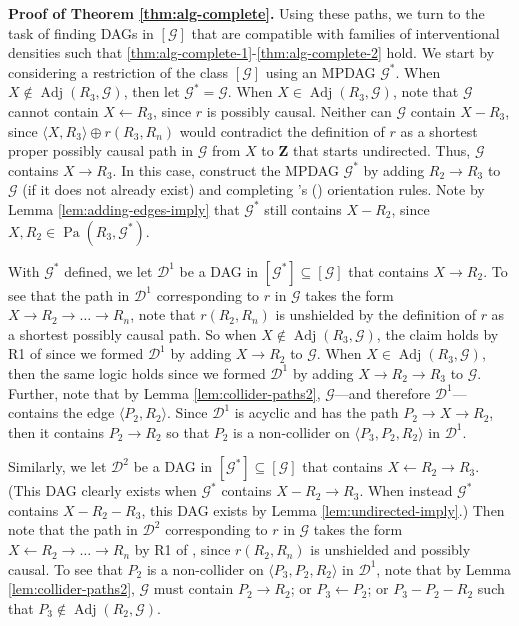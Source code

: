 \documentclass[11pt]{article}
\DeclareMathOperator{\Pa}{Pa}
\DeclareMathOperator{\Adj}{Adj}
\newcommand{\mb}[1]{\mathbf{#1}}
\newcommand{\g}[1][G]{\mathcal{#1}}
\newenvironment{proofofnoqed}[1][]{\noindent \textbf{Proof of #1.}}{}
\begin{document}
\begin{proofofnoqed}[Theorem \ref{thm:alg-complete}]
    Using these paths, we turn to the task of finding DAGs in $[\g]$ that are compatible with families of interventional densities such that \eqref{thm:alg-complete-1}-\eqref{thm:alg-complete-2} hold. We start by considering a restriction of the class $[\g]$ using an MPDAG $\g^*$. When $X \notin \Adj(R_3, \g)$, then let $\g^* = \g$. When $X \in \Adj(R_3, \g)$, note that $\g$ cannot contain $X \gets R_3$, since $r$ is possibly causal. Neither can $\g$ contain $X - R_3$, since $\langle X, R_3 \rangle \oplus r(R_3,R_n)$ would contradict the definition of $r$ as a shortest proper possibly causal path in $\g$ from $X$ to $\mb{Z}$ that starts undirected. Thus, $\g$ contains $X \to R_3$. In this case, construct the MPDAG $\g^*$ by adding $R_2 \to R_3$ to $\g$ (if it does not already exist) and completing \citeauthor{meek1995causal}'s (\citeyear{meek1995causal}) orientation rules. Note by Lemma \ref{lem:adding-edges-imply} that $\g^*$ still contains $X - R_2$, since $X,R_2 \in \Pa(R_3,\g^*)$.

    With $\g^*$ defined, we let $\g[D]^1$ be a DAG in $[\g^*] \subseteq [\g]$ that contains $X \to R_2$. To see that the path in $\g[D]^1$ corresponding to $r$ in $\g$ takes the form $X \to R_2 \to \dots \to R_n$, note that $r(R_2,R_n)$ is unshielded by the definition of $r$ as a shortest possibly causal path. So when $X \notin \Adj(R_3, \g)$, the claim holds by R1 of \cite{meek1995causal} since we formed $\g[D]^1$ by adding $X \to R_2$ to $\g$. When $X \in \Adj(R_3, \g)$, then the same logic holds since we formed $\g[D]^1$ by adding $X \to R_2 \to R_3$ to $\g$. Further, note that by Lemma \ref{lem:collider-paths2}, $\g$---and therefore $\g[D]^1$---contains the edge $\langle P_2, R_2 \rangle$. Since $\g[D]^1$ is acyclic and has the path $P_2 \to X \to R_2$, then it contains $P_2 \to R_2$ so that $P_2$ is a non-collider on $\langle P_3, P_2, R_2 \rangle$ in $\g[D]^1$.

    Similarly, we let $\g[D]^2$ be a DAG in $[\g^*] \subseteq [\g]$ that contains $X \gets R_2 \to R_3$. (This DAG clearly exists when $\g^*$ contains $X - R_2 \to R_3$. When instead $\g^*$ contains $X - R_2 - R_3$, this DAG exists by Lemma \ref{lem:undirected-imply}.) Then note that the path in $\g[D]^2$ corresponding to $r$ in $\g$ takes the form $X \gets R_2 \to \dots \to R_n$ by R1 of \cite{meek1995causal}, since $r(R_2,R_n)$ is unshielded and possibly causal. To see that $P_2$ is a non-collider on $\langle P_3, P_2, R_2 \rangle$ in $\g[D]^1$, note that by Lemma \ref{lem:collider-paths2}, $\g$ must contain $P_2 \to R_2$; or $P_3 \gets P_2$; or $P_3 - P_2 - R_2$ such that $P_3 \notin \Adj(R_2, \g)$.


\end{proofofnoqed}
\end{document}
